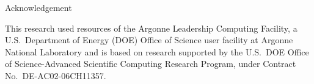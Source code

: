 
\begin{frame}[plain]{Acknowledgement}
  \vfill
  \begin{center}
  \begin{minipage}{0.85\textwidth}
    \small
    This research used resources of the Argonne Leadership Computing
    Facility, a U.S.\ Department of Energy (DOE) Office of Science user
    facility at Argonne National Laboratory and is based on research
    supported by the U.S.\ DOE Office of Science-Advanced Scientific
    Computing Research Program, under Contract No.\ DE-AC02-06CH11357.
  \end{minipage}
  \end{center}
  \vfill
\end{frame}

